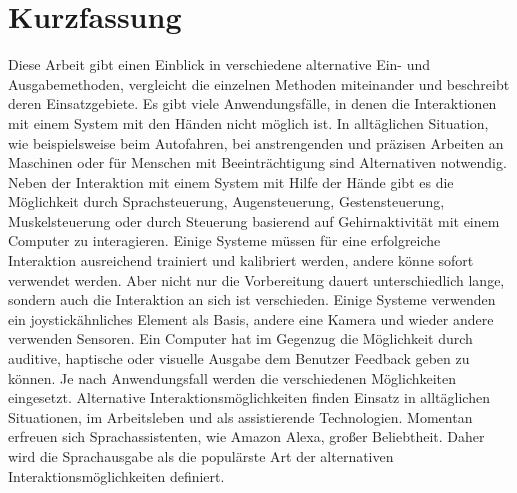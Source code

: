 \chapter{Kurzfassung}
Diese Arbeit gibt einen Einblick in verschiedene alternative Ein- und Ausgabemethoden, vergleicht die einzelnen Methoden miteinander und beschreibt deren Einsatzgebiete.
\newline \newline
Es gibt viele Anwendungsfälle, in denen die Interaktionen mit einem System mit den
Händen nicht möglich ist. In alltäglichen Situation, wie beispielsweise beim Autofahren,
bei anstrengenden und präzisen Arbeiten an Maschinen oder für Menschen mit
\mbox{Beeinträchtigung} sind Alternativen notwendig.
\newline \newline
Neben der Interaktion mit einem System mit Hilfe der Hände gibt es die \mbox{Möglichkeit} durch Sprachsteuerung, Augensteuerung, Gestensteuerung, Muskelsteuerung oder durch Steuerung basierend auf Gehirnaktivität mit einem Computer zu interagieren. Einige Systeme müssen für eine erfolgreiche Interaktion ausreichend trainiert und kalibriert werden, andere könne sofort verwendet werden. Aber nicht nur die Vorbereitung dauert unterschiedlich lange, sondern auch die Interaktion an sich ist verschieden. Einige Systeme verwenden ein joystickähnliches Element als Basis, andere eine Kamera und wieder andere verwenden Sensoren.
\newline \newline
Ein Computer hat im Gegenzug die Möglichkeit durch auditive, haptische oder visuelle Ausgabe dem Benutzer Feedback geben zu können. Je nach Anwendungsfall werden die verschiedenen Möglichkeiten eingesetzt.
\newline \newline
Alternative Interaktionsmöglichkeiten finden Einsatz in alltäglichen Situationen, im Arbeitsleben und als assistierende Technologien. Momentan erfreuen sich Sprachassistenten, wie Amazon Alexa, großer Beliebtheit. Daher wird die Sprachausgabe als die populärste Art der alternativen Interaktionsmöglichkeiten definiert.
 

